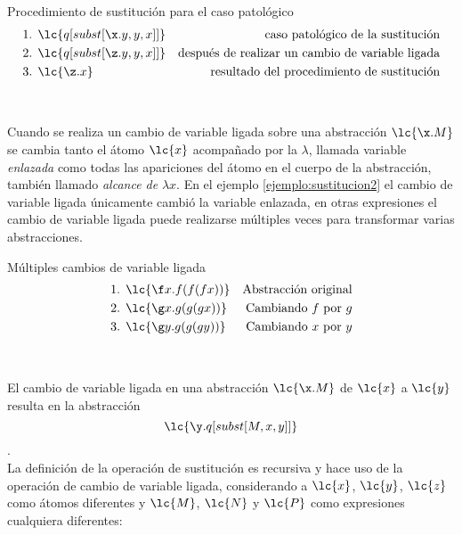 \begin{ejemplo} Procedimiento de sustitución para el caso patológico
  \label{ejemplo:sustitucion2}
  \begin{align*}
    \text{1. } &\lc{q[subst[\x.y,y,x]]} &\text{caso patológico de la sustitución} \\
    \text{2. } &\lc{q[subst[\z.y,y,x]]} &\text{después de realizar un cambio de variable ligada} \\
    \text{3. } &\lc{\z.x}               &\text{resultado del procedimiento de sustitución}
  \end{align*}
\end{ejemplo} \

Cuando se realiza un cambio de variable ligada sobre una abstracción
\(\lc{\x.M}\) se cambia tanto el átomo \(\lc{x}\) acompañado por la \(\lambda\),
llamada variable \emph{enlazada} como todas las apariciones del átomo en el
cuerpo de la abstracción, también llamado \emph{alcance de} \(\lambda x\). En el
ejemplo \ref{ejemplo:sustitucion2} el cambio de variable ligada únicamente
cambió la variable enlazada, en otras expresiones el cambio de variable ligada
puede realizarse múltiples veces para transformar varias abstracciones. \\

\begin{ejemplo} Múltiples cambios de variable ligada
  \label{ejemplo:variableligada1}
  \begin{align*}
    \text{1. } &\lc{\f x.f(f(f x))} &\text{Abstracción original} \\
    \text{2. } &\lc{\g x.g(g(g x))} &\text{Cambiando \(f\) por \(g\)} \\
    \text{3. } &\lc{\g y.g(g(g y))} &\text{Cambiando \(x\) por \(y\)}
  \end{align*}
\end{ejemplo} \

El cambio de variable ligada en una abstracción \(\lc{\x.M}\) de \(\lc{x}\) a
\(\lc{y}\) resulta en la abstracción \[\lc{\y.q[subst[M,x,y]]}\]. \\

La definición de la operación de sustitución es recursiva y hace uso de la
operación de cambio de variable ligada, considerando a \(\lc{x}\), \(\lc{y}\),
\(\lc{z}\) como átomos diferentes y \(\lc{M}\), \(\lc{N}\) y \(\lc{P}\) como
expresiones cualquiera diferentes: \\

